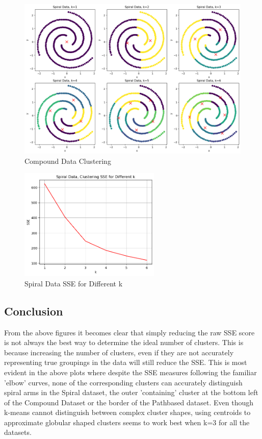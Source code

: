 \documentclass{article}
\begin{document}
\begin{figure}[H]
    \centering
    \includegraphics[width=\textwidth]{spiral_p.png}
    \caption{Compound Data Clustering}
\end{figure}
\begin{figure}[H]
    \centering
    \includegraphics[width=0.6\textwidth]{spiral_s.png}
    \caption{Spiral Data SSE for Different k}
\end{figure}

\subsection{Conclusion}
From the above figures it becomes clear that simply reducing the raw SSE score is not always the best
way to determine the ideal number of clusters. This is because increasing the number of clusters, even
if they are not accurately representing true groupings in the data will still reduce the SSE. This is
most evident in the above plots where despite the SSE measures following the familiar 'elbow' curves,
none of the corresponding clusters can accurately distinguish spiral arms in the Spiral dataset,
the outer 'containing' cluster at the bottom left of the Compound Dataset or the border of the Pathbased
dataset. Even though k-means cannot distinguish between complex cluster shapes, using centroids to
approximate globular shaped clusters seems to work best when k=3 for all the datasets.   
\end{document}
